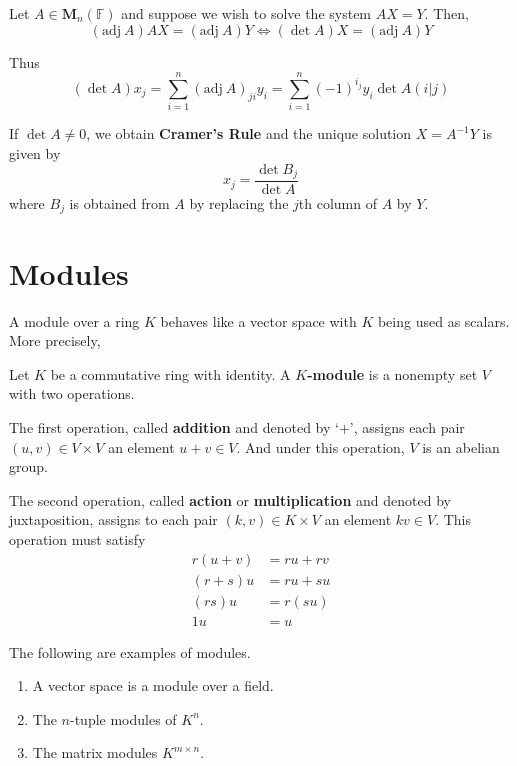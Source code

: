 \begin{example}
	Let $A \in \textbf{M}_n(\mathbb{F})$ and suppose we wish to solve the system $AX = Y$. Then,
	\[
		(\text{adj}~A)AX = (\text{adj}~A)Y \iff (\det A)X = (\text{adj}~A)Y
	\]
	
	Thus
	\[
		(\det A)x_j = \sum_{i=1}^n (\text{adj}~A)_{ji} y_i = \sum_{i=1}^n (-1)^{i_j} y_i \det A(i|j)
	\]
	
	If $\det A \neq 0$, we obtain \textbf{Cramer's Rule} and the unique solution $X = A^{-1}Y$ is given by
	\[
		x_j = \frac{\det B_j}{\det A}
	\]
	where $B_j$ is obtained from $A$ by replacing the $j$th column of $A$ by $Y$.
\end{example}

\section{Modules}

A module over a ring $K$ behaves like a vector space with $K$ being used as scalars. More precisely,

\begin{definition}[Module]
	Let $K$ be a commutative ring with identity. A \textbf{$K$-module} is a nonempty set $V$ with two operations.

	The first operation, called \textbf{addition} and denoted by `+', assigns each pair $(u, v) \in V \times V$ an element $u+v \in V$. And under this operation, $V$ is an abelian group.

	The second operation, called \textbf{action} or \textbf{multiplication} and denoted by juxtaposition, assigns to each pair $(k, v) \in K \times V$ an element $kv \in V$. This operation must satisfy 
	\begin{equation*}
		\begin{aligned}
			r(u+v) &= ru + rv \\
			(r+s)u &= ru + su \\
			(rs)u &= r(su) \\
			1u &= u
		\end{aligned}
	\end{equation*}
\end{definition}

\begin{example}
	The following are examples of modules.
	\begin{enumerate}
		\item A vector space is a module over a field.
		\item The $n$-tuple modules of $K^n$.
		\item The matrix modules $K^{m \times n}$.
	\end{enumerate}
\end{example}

